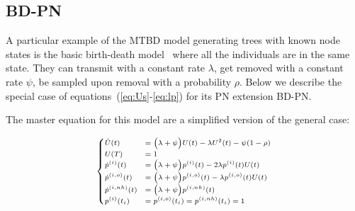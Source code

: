 \documentclass[a4paper,10pt]{article}
\begin{document}
\subsection{BD-PN}
A particular example of the MTBD model generating trees with known node states is the basic birth-death model~\citep{Stadler2009} where all the individuals are in the same state. They can transmit with a constant rate $\lambda$, get removed with a constant rate $\psi$, be sampled upon removal with a probability $\rho$. Below we describe the special case of equations~(\ref{eq:Us}-\ref{eq:lp}) for its PN extension BD-PN.

%
%

The master equation for this model are a simplified version of the general case:

\begin{equation}
\scriptsize
\begin{cases}
\dot{U}(t) &= \Big(\lambda + \psi\Big) U(t) - \lambda U^2(t) - \psi (1 - \rho)\\
U(T) &=  1\\
\dot{p}^{(i)}(t) &=  \Big(\lambda + \psi\Big) p^{(i)}(t) - 2 \lambda p^{(i)}(t)U(t)\\
\dot{p}^{(i,o)}(t) &=  \Big(\lambda + \psi\Big) p^{(i,o)}(t) - \lambda p^{(i,o)}(t)U(t)\\
\dot{p}^{(i,nh)}(t) &=  \Big(\lambda + \psi\Big) p^{(i,nh)}(t)\\
p^{(i)}(t_i) &= p^{(i,o)}(t_i) = p^{(i,nh)}(t_i) = 1
\end{cases}
\end{equation}
\end{document}
